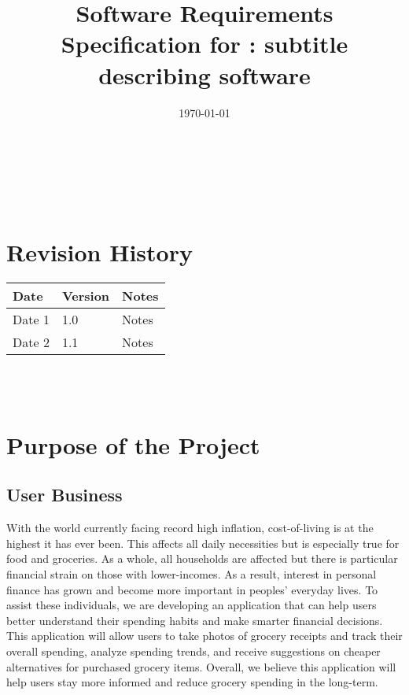 \documentclass[12pt]{article}
\begin{document}
\title{Software Requirements Specification for \progname: subtitle describing software} 
\author{\authname}
\date{\today}
	
\maketitle

~\newpage


\tableofcontents

~\newpage

\section*{Revision History}

\begin{tabularx}{\textwidth}{p{3cm}p{2cm}X}
\toprule {\textbf{Date}} & {\textbf{Version}} & {\textbf{Notes}}\\
\midrule
Date 1 & 1.0 & Notes\\
Date 2 & 1.1 & Notes\\
\bottomrule
\end{tabularx}

~\\

~\newpage
\section{Purpose of the Project}
\subsection{User Business}

With the world currently facing record high inflation, cost-of-living is at the highest
it has ever been. This affects all daily necessities but is especially true for food and groceries.
As a whole, all households are affected but there is particular financial strain on those with lower-incomes.
As a result, interest in personal finance has grown and become more important in peoples' everyday lives.
To assist these individuals, we are developing an application that can help users better understand their
spending habits and make smarter financial decisions. This application will allow users to
take photos of grocery receipts and track their overall spending, analyze spending trends, and receive
suggestions on cheaper alternatives for purchased grocery items. Overall, we believe this application
will help users stay more informed and reduce grocery spending in the long-term.
\end{document}

